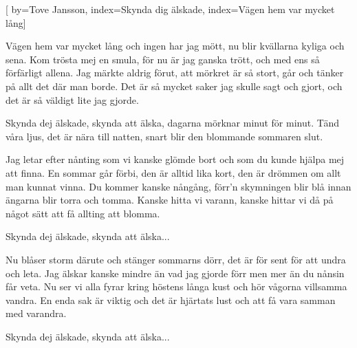 


[ 	%
	by={Tove Jansson},
	index={Skynda dig älskade},
	index={Vägen hem var mycket lång}]		%
	
\beginverse*		%
Vägen hem var mycket lång och ingen har jag mött,
nu blir kvällarna kyliga och sena.
Kom trösta mej en smula, för nu är jag ganska trött,
och med ens så förfärligt allena.
Jag märkte aldrig förut, att mörkret är så stort,
går och tänker på allt det där man borde.
Det är så mycket saker jag skulle sagt och gjort,
och det är så väldigt lite jag gjorde.
\endverse			%

\beginchorus
Skynda dej älskade, skynda att älska,
dagarna mörknar minut för minut.
Tänd våra ljus, det är nära till natten,
snart blir den blommande sommaren slut.
\endchorus

\beginverse*		%
Jag letar efter nånting som vi kanske glömde bort
och som du kunde hjälpa mej att finna.
En sommar går förbi, den är alltid lika kort,
den är drömmen om allt man kunnat vinna.
Du kommer kanske nångång, förr'n skymningen blir blå
innan ängarna blir torra och tomma.
Kanske hitta vi varann, kanske hittar vi då på
något sätt att få allting att blomma.
\endverse			%

\beginchorus
Skynda dej älskade, skynda att älska...
\endchorus

\beginverse*		%
Nu blåser storm därute och stänger sommarns dörr,
det är för sent för att undra och leta.
Jag älskar kanske mindre än vad jag gjorde förr
men mer än du nånsin får veta.
Nu ser vi alla fyrar kring höstens långa kust
och hör vågorna villsamma vandra.
En enda sak är viktig och det är hjärtats lust
och att få vara samman med varandra.
\endverse			%

\beginchorus
Skynda dej älskade, skynda att älska...
\endchorus
\endsong			%
